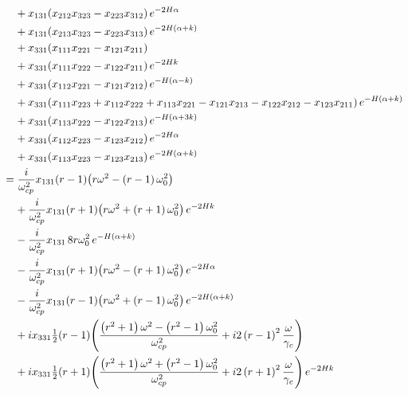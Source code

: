 \documentclass[reqno]{amsart}
\numberwithin{equation}{section}
\numberwithin{figure}{section}
\begin{document}
\begin{align*}
  &\phantom{=}\,\,+x_{131}\!\left(x_{212}x_{323}-x_{223}x_{312}\right)e^{-2\aHeight\alpha} \\
  &\phantom{=}\,\,+x_{131}\!\left(x_{213}x_{323}-x_{223}x_{313}\right)e^{-2\aHeight\left(\alpha+k\right)} \\
  &\phantom{=}\,\,+x_{331}\!\left(x_{111}x_{221}-x_{121}x_{211}\right) \\
  &\phantom{=}\,\,+x_{331}\!\left(x_{111}x_{222}-x_{122}x_{211}\right)e^{-2\aHeight k} \\
  &\phantom{=}\,\,+x_{331}\!\left(x_{112}x_{221}-x_{121}x_{212}\right)e^{-\aHeight\left(\alpha-k\right)} \\
  &\phantom{=}\,\,+x_{331}\!\left(x_{111}x_{223}+x_{112}x_{222}+x_{113}x_{221}-x_{121}x_{213}-x_{122}x_{212}-x_{123}x_{211}\right)e^{-\aHeight\left(\alpha+k\right)} \\
  &\phantom{=}\,\,+x_{331}\!\left(x_{113}x_{222}-x_{122}x_{213}\right)e^{-\aHeight\left(\alpha+3k\right)} \\
  &\phantom{=}\,\,+x_{331}\!\left(x_{112}x_{223}-x_{123}x_{212}\right)e^{-2\aHeight\alpha} \\
  &\phantom{=}\,\,+x_{331}\!\left(x_{113}x_{223}-x_{123}x_{213}\right)e^{-2\aHeight\left(\alpha+k\right)} \\
  &= \frac{i}{\omega_{cp}^{2}}x_{131}\!\left(r-1\right)\!\left(r\omega^{2}-\left(r-1\right)\omega_{0}^{2}\right) \\
  &\phantom{=}\,\,+\frac{i}{\omega_{cp}^{2}}x_{131}\!\left(r+1\right)\!\left(r\omega^{2}+\left(r+1\right)\omega_{0}^{2}\right)e^{-2\aHeight k} \\
  &\phantom{=}\,\,-\frac{i}{\omega_{cp}^{2}}x_{131}\,8r\omega_{0}^{2}\,e^{-\aHeight\left(\alpha+k\right)} \\
  &\phantom{=}\,\,-\frac{i}{\omega_{cp}^{2}}x_{131}\!\left(r+1\right)\!\left(r\omega^{2}-\left(r+1\right)\omega_{0}^{2}\right)e^{-2\aHeight\alpha} \\
  &\phantom{=}\,\,-\frac{i}{\omega_{cp}^{2}}x_{131}\!\left(r-1\right)\!\left(r\omega^{2}+\left(r-1\right)\omega_{0}^{2}\right)e^{-2\aHeight\left(\alpha+k\right)} \\
  &\phantom{=}\,\,+ix_{331}\tfrac{1}{2}\!\left(r-1\right)\!\left(\frac{\left(r^{2}+1\right)\omega^{2}-\left(r^{2}-1\right)\omega_{0}^{2}}{\omega_{cp}^{2}}+i2\left(r-1\right)^{2}\frac{\omega}{\gamma_{c}}\right) \\
  &\phantom{=}\,\,+ix_{331}\tfrac{1}{2}\!\left(r+1\right)\!\left(\frac{\left(r^{2}+1\right)\omega^{2}+\left(r^{2}-1\right)\omega_{0}^{2}}{\omega_{cp}^{2}}+i2\left(r+1\right)^{2}\frac{\omega}{\gamma_{c}}\right)e^{-2\aHeight k} \\

\end{align*}
\end{document}
